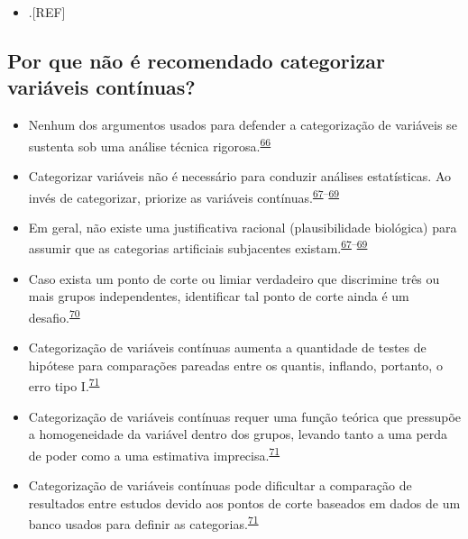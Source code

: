 \documentclass[
  a4paper,
]{book}
\providecommand{\tightlist}{%
  \setlength{\itemsep}{0pt}\setlength{\parskip}{0pt}}
\begin{document}
\begin{itemize}
\tightlist
\item
  .{[}REF{]}
\end{itemize}

\hypertarget{por-que-nuxe3o-uxe9-recomendado-categorizar-variuxe1veis-contuxednuas}{%
\subsection{Por que não é recomendado categorizar variáveis contínuas?}\label{por-que-nuxe3o-uxe9-recomendado-categorizar-variuxe1veis-contuxednuas}}

\begin{itemize}
\item
  Nenhum dos argumentos usados para defender a categorização de variáveis se sustenta sob uma análise técnica rigorosa.\textsuperscript{\protect\hyperlink{ref-MacCallum2002}{66}}
\item
  Categorizar variáveis não é necessário para conduzir análises estatísticas. Ao invés de categorizar, priorize as variáveis contínuas.\textsuperscript{\protect\hyperlink{ref-Altman2006}{67}--\protect\hyperlink{ref-Collins2016}{69}}
\item
  Em geral, não existe uma justificativa racional (plausibilidade biológica) para assumir que as categorias artificiais subjacentes existam.\textsuperscript{\protect\hyperlink{ref-Altman2006}{67}--\protect\hyperlink{ref-Collins2016}{69}}
\item
  Caso exista um ponto de corte ou limiar verdadeiro que discrimine três ou mais grupos independentes, identificar tal ponto de corte ainda é um desafio.\textsuperscript{\protect\hyperlink{ref-Prince2017}{70}}
\item
  Categorização de variáveis contínuas aumenta a quantidade de testes de hipótese para comparações pareadas entre os quantis, inflando, portanto, o erro tipo I.\textsuperscript{\protect\hyperlink{ref-Bennette2012}{71}}
\item
  Categorização de variáveis contínuas requer uma função teórica que pressupõe a homogeneidade da variável dentro dos grupos, levando tanto a uma perda de poder como a uma estimativa imprecisa.\textsuperscript{\protect\hyperlink{ref-Bennette2012}{71}}
\item
  Categorização de variáveis contínuas pode dificultar a comparação de resultados entre estudos devido aos pontos de corte baseados em dados de um banco usados para definir as categorias.\textsuperscript{\protect\hyperlink{ref-Bennette2012}{71}}
\end{itemize}
\end{document}
